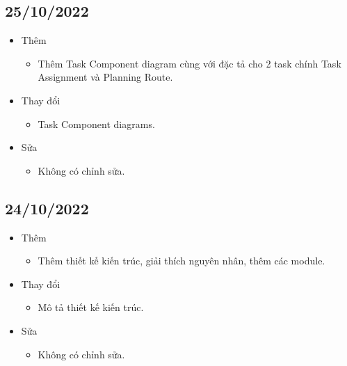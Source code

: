     \subsection{25/10/2022}
    \begin{itemize}
        \item Thêm
            \begin{itemize}
                \item  Thêm Task Component diagram cùng với đặc tả cho 2 task chính Task Assignment và Planning Route. 
            \end{itemize}
        \item Thay đổi
            \begin{itemize}
                \item Task Component diagrams. 
            \end{itemize}
        \item Sửa
            \begin{itemize}
                \item Không có chỉnh sửa. 
            \end{itemize}
    \end{itemize}
    \subsection{24/10/2022}
    \begin{itemize}
        \item Thêm
            \begin{itemize}
                \item  Thêm thiết kế kiến trúc, giải thích nguyên nhân, thêm các module. 
            \end{itemize}
        \item Thay đổi
            \begin{itemize}
                \item Mô tả thiết kế kiến trúc. 
            \end{itemize}
        \item Sửa
            \begin{itemize}
                \item  Không có chỉnh sửa.
            \end{itemize}
    \end{itemize}
